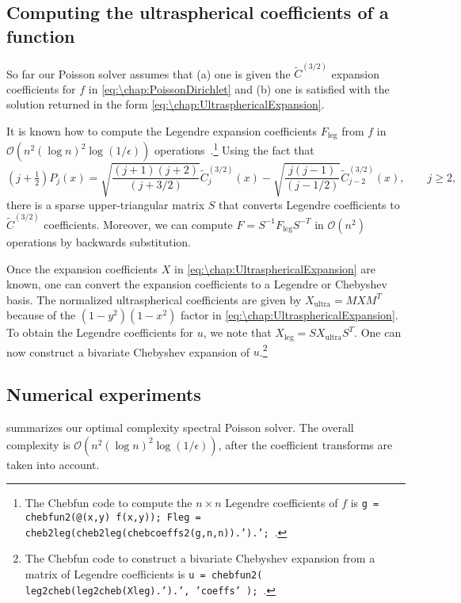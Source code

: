 \subsection{Computing the ultraspherical coefficients of a function}\label{sec:\chap:UltrasphericalCoefficients} 
So far our Poisson solver assumes that (a) one is given the $\tilde{C}^{(3/2)}$ expansion coefficients for $f$ in \cref{eq:\chap:PoissonDirichlet} and (b) one is satisfied with the solution returned in 
the form \cref{eq:\chap:UltrasphericalExpansion}.

It is known how to compute the Legendre expansion coefficients $F_{\text{leg}}$ from $f$ in $\mathcal{O}(n^2 (\log n)^2 \log(1/\epsilon))$ operations~\cite{Townsend_18_01}.\footnote{The Chebfun code to compute the $n\times n$ Legendre coefficients of $f$ is {\tt g = chebfun2(@(x,y) f(x,y)); Fleg = cheb2leg(cheb2leg(chebcoeffs2(g,n,n)).').';}~\cite{Chebfun}.} Using the fact that~\cite[(18.7.9) \& (18.9.7)]{NISTHandbook}
\[
(j+\tfrac{1}{2})P_j(x) = \sqrt{\frac{(j+1)(j+2)}{(j+3/2)}}\tilde{C}^{(3/2)}_j(x) - \sqrt{\frac{j(j-1)}{(j-1/2)}}\tilde{C}^{(3/2)}_{j-2}(x), \qquad j\geq 2, 
\]
there is a sparse upper-triangular matrix $S$ that converts Legendre coefficients to $\tilde{C}^{(3/2)}$ coefficients. Moreover, we can compute $F = S^{-1}F_{\text{leg}}S^{-T}$ in $\mathcal{O}(n^2)$ operations by backwards substitution.  

Once the expansion coefficients $X$ in \cref{eq:\chap:UltrasphericalExpansion} are known, one can convert the expansion coefficients to a Legendre or Chebyshev basis. The normalized ultraspherical coefficients are given by $X_{\text{ultra}} = MXM^T$ because of the $(1-y^2)(1-x^2)$ factor in \cref{eq:\chap:UltrasphericalExpansion}. To obtain the Legendre coefficients for $u$, we note that $X_{\text{leg}} = SX_{\text{ultra}}S^T$. One can now construct a bivariate Chebyshev expansion of $u$.\footnote{The Chebfun code to construct a bivariate Chebyshev expansion from a matrix of Legendre coefficients is {\tt u = chebfun2( leg2cheb(leg2cheb(Xleg).').', 'coeffs' );}~\cite{Chebfun}.}

\subsection{Numerical experiments}\label{sec:\chap:square_experiments}
 summarizes our optimal complexity spectral Poisson solver. The overall complexity is \allowbreak$\mathcal{O}(n^2 (\log n)^2 \log(1/\epsilon))$, after the coefficient transforms are taken into account.

